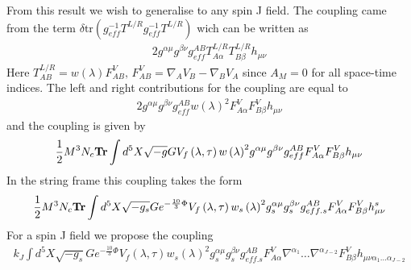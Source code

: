 \documentclass[10 pt]{article}
\begin{document}
From this result we wish to generalise to any spin J field. The coupling came from the term $\delta \text{tr} \left( g^{-1}_{eff} T^{L/R} g^{-1}_{eff} T^{L/R} \right)$ wich can be written as
\begin{align}
2 g^{\alpha \mu} g^{\beta \nu} g_{eff}^{AB} T^{L/R}_{A \alpha} T^{L/R}_{B \beta} h_{\mu \nu}
\end{align}
Here $T^{L/R}_{AB} = w\left(\lambda\right) F^V_{AB}, \, F^V_{AB} = \nabla_A V_B - \nabla_B V_A$ since $A_M = 0$ for all space-time indices. The left and right contributions for the coupling are equal to
\begin{align}
2 g^{\alpha \mu} g^{\beta \nu} g_{eff}^{AB} {w\left(\lambda\right)}^2 F^{V}_{A \alpha} F^{V}_{B \beta} h_{\mu \nu}
\end{align}
and the coupling is given by
\begin{align}
\frac{1}{2} M^3 N_c \bold{Tr} \int d^5 X \sqrt{-g} G V_{f} \left(\lambda, \tau \right)  {w\left(\lambda\right)}^2 g^{\alpha \mu} g^{\beta \nu} g_{eff}^{AB} F^V_{A \alpha} F^V_{B \beta} h_{\mu \nu}
\end{align}
In the string frame this coupling takes the form
\begin{align}
\frac{1}{2} M^3 N_c \bold{Tr} \int d^5 X \sqrt{-g_{s}} G e^{-\frac{10}{3}\Phi} V_{f} \left(\lambda, \tau \right)  {w_s\left(\lambda\right)}^2 g^{\alpha \mu}_s g^{\beta \nu}_s g_{eff. s}^{AB} F^V_{A \alpha} F^V_{B \beta} h_{\mu \nu}^s
\end{align}
For a spin J field we propose the coupling
\begin{align}
k_J \int d^5X \sqrt{-g_s} G e^{-\frac{10}{3} \Phi} V_f \left( \lambda, \tau \right) {w_s\left(\lambda \right)}^2 g_s^{\alpha \mu} g_s^{\beta \nu} g_{eff. s}^{AB} F^V_{A\alpha} \nabla^{\alpha_1} \dots \nabla^{\alpha_{J-2}} F^V_{B \beta} h_{\mu \nu \alpha_1 \dots \alpha_{J-2}}
\end{align}
\end{document}
